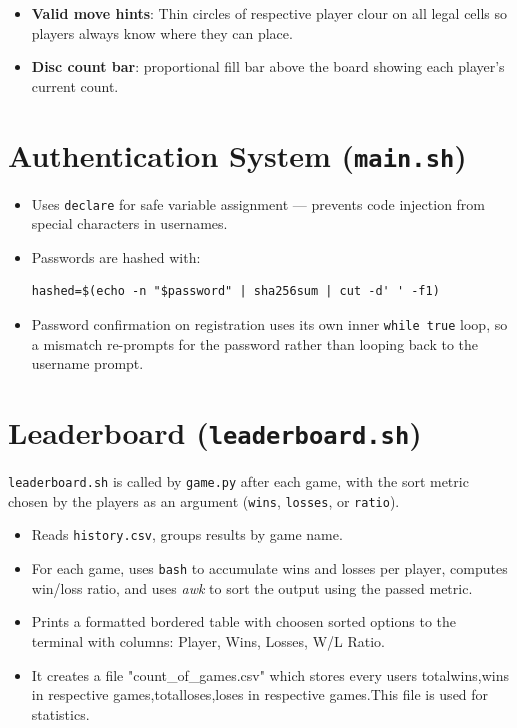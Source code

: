 \documentclass[12pt, letterpaper]{article}
\begin{document}
\begin{itemize}
    \item \textbf{Valid move hints}: Thin circles of respective player clour on all legal cells so players
          always know where they can place.
    
    \item \textbf{Disc count bar}: proportional fill bar above the board
          showing each player's current count.
\end{itemize}

\section{Authentication System (\texttt{main.sh})}

\begin{itemize}
    \item Uses \texttt{declare} for safe variable
          assignment --- prevents code injection from special characters in
          usernames.
    \item Passwords are hashed with:
\begin{lstlisting}[style=bashstyle]
hashed=$(echo -n "$password" | sha256sum | cut -d' ' -f1)
\end{lstlisting}
    \item Password confirmation on registration uses its own inner
          \texttt{while true} loop, so a mismatch re-prompts for the password
          rather than looping back to the username prompt.
\end{itemize}

\section{Leaderboard (\texttt{leaderboard.sh})}

\texttt{leaderboard.sh} is called by \texttt{game.py} after each game, with
the sort metric chosen by the players as an argument
(\texttt{wins}, \texttt{losses}, or \texttt{ratio}).

\begin{itemize}
    \item Reads \texttt{history.csv}, groups results by game name.
    \item For each game, uses \texttt{bash} to accumulate wins and losses per
          player, computes win/loss ratio, and uses \textit{awk} to sort the output using the
          passed metric.
    \item Prints a formatted bordered table with choosen sorted options to the terminal with columns:
           Player, Wins, Losses, W/L Ratio.
    \item It creates a file "count\_of\_games.csv" which stores every users totalwins,wins in respective games,totalloses,loses in respective games.This file is used for statistics.
   
\end{itemize}
\end{document}
